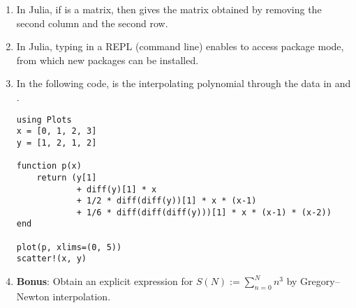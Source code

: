 \documentclass[a4paper]{article}
\begin{document}
\begin{enumerate}
    \item
        In Julia, if  is a matrix,
        then  gives the matrix obtained by removing the second column and the second row.

    \item
        In Julia, typing \julia{]} in a REPL (command line) enables to access package mode,
        from which new packages can be installed.

    \item
        In the following code,
         is the interpolating polynomial through the data in  and .
        \begin{verbatim}
using Plots
x = [0, 1, 2, 3]
y = [1, 2, 1, 2]

function p(x)
    return (y[1]
            + diff(y)[1] * x
            + 1/2 * diff(diff(y))[1] * x * (x-1)
            + 1/6 * diff(diff(diff(y)))[1] * x * (x-1) * (x-2))
end

plot(p, xlims=(0, 5))
scatter!(x, y)
        \end{verbatim}

    \item \textbf{Bonus}: Obtain an explicit expression for $S(N) := \sum_{n=0}^{N} n^3$ by Gregory--Newton interpolation.
\end{enumerate}
\end{document}
